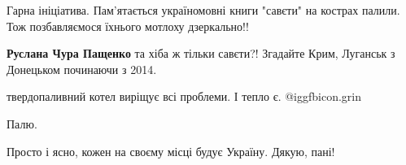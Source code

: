  
 
 
 
 
 
Гарна ініціатива. Пам'ятається україномовні книги "савєти" на кострах палили. Тож позбавляємося їхнього мотлоху дзеркально!!

 
\textbf{Руслана Чура Пащенко} та хіба ж тільки савєти?! Згадайте Крим, Луганськ з Донецьком починаючи з 2014.


 
твердопаливний котел виріщує всі проблеми. І тепло є.  @igg{fbicon.grin} 

 
Палю.

 
Просто і ясно, кожен на своєму місці будує Україну. Дякую, пані!

 
